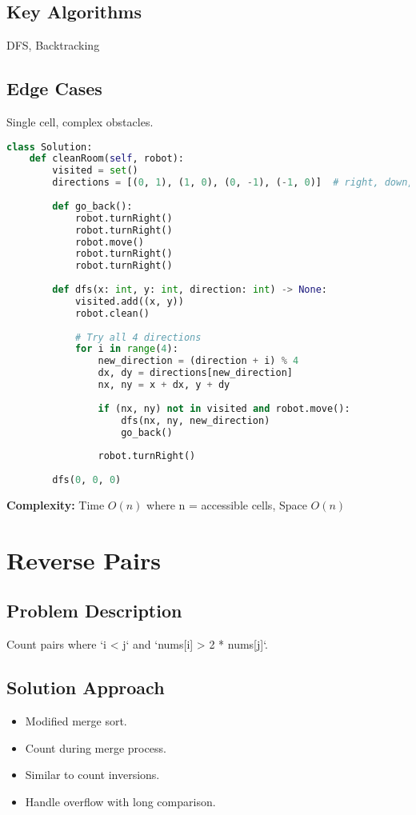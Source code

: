 \documentclass[10pt, a4paper]{article}
\begin{document}
\subsection*{Key Algorithms}
DFS, Backtracking

\subsection*{Edge Cases}
Single cell, complex obstacles.

\begin{lstlisting}[language=Python]
class Solution:
    def cleanRoom(self, robot):
        visited = set()
        directions = [(0, 1), (1, 0), (0, -1), (-1, 0)]  # right, down, left, up
        
        def go_back():
            robot.turnRight()
            robot.turnRight()
            robot.move()
            robot.turnRight()
            robot.turnRight()
        
        def dfs(x: int, y: int, direction: int) -> None:
            visited.add((x, y))
            robot.clean()
            
            # Try all 4 directions
            for i in range(4):
                new_direction = (direction + i) % 4
                dx, dy = directions[new_direction]
                nx, ny = x + dx, y + dy
                
                if (nx, ny) not in visited and robot.move():
                    dfs(nx, ny, new_direction)
                    go_back()
                
                robot.turnRight()
        
        dfs(0, 0, 0)
\end{lstlisting}
\textbf{Complexity:} Time $O(n)$ where n = accessible cells, Space $O(n)$

\section{Reverse Pairs}
\subsection*{Problem Description}
Count pairs where `i < j` and `nums[i] > 2 * nums[j]`.

\subsection*{Solution Approach}
\begin{itemize}
    \item Modified merge sort.
    \item Count during merge process.
    \item Similar to count inversions.
    \item Handle overflow with long comparison.
\end{itemize}
\end{document}
